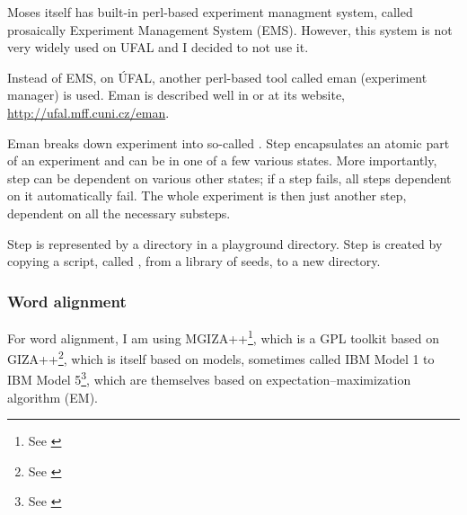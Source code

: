 Moses itself has built-in perl-based experiment managment system, called prosaically Experiment Management System (EMS). However, this system is not very widely used on UFAL and I decided to not use it.

Instead of EMS, on ÚFAL, another perl-based tool called eman (experiment manager) is used. Eman is described well in \cite{eman} or at its website, \url{http://ufal.mff.cuni.cz/eman}.  

Eman breaks down experiment into so-called . Step encapsulates an atomic part of an experiment and can be in one of a few various states. More importantly, step can be dependent on various other states; if a step fails, all steps dependent on it automatically fail. The whole experiment is then just another step, dependent on all the necessary substeps.

Step is represented by a directory in a playground directory. Step is created by copying a script, called , from a library of seeds, to a new directory.





\subsubsection{Word alignment}
For word alignment, I am using MGIZA++\footnote{See \cite{mgiza}}, which is a GPL toolkit based on GIZA++\footnote{See \cite{giza}}, which is itself based on models, sometimes called IBM Model 1 to IBM Model 5\footnote{See \cite{ibm}}, which are themselves based on expectation–maximization algorithm (EM).

